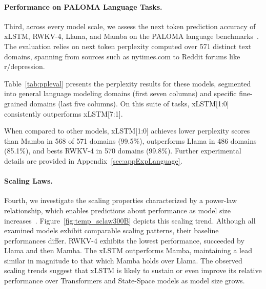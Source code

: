 \paragraph{Performance on PALOMA Language Tasks.} Third, across every model scale, we assess the next token prediction accuracy of xLSTM, RWKV-4, Llama, and Mamba on the PALOMA language benchmarks~\citep{Magnusson:23arxivshort}. The evaluation relies on next token perplexity computed over 571 distinct text domains, spanning from sources such as nytimes.com to Reddit forums like r/depression.

Table~\ref{tab:ppleval} presents the perplexity results for these models, segmented into general language modeling domains (first seven columns) and specific fine-grained domains (last five columns). On this suite of tasks, xLSTM[1:0] consistently outperforms xLSTM[7:1].

When compared to other models, xLSTM[1:0] achieves lower perplexity scores than Mamba in 568 of 571 domains (99.5\%), outperforms Llama in 486 domains (85.1\%), and bests RWKV-4 in 570 domains (99.8\%). Further experimental details are provided in Appendix~\ref{sec:appExpLanguage}.

\paragraph{Scaling Laws.} Fourth, we investigate the scaling properties characterized by a power-law relationship, which enables predictions about performance as model size increases~\citep{Kaplan:20,Brown:20short}. Figure~\ref{fig:temp_sclaw300B} depicts this scaling trend. Although all examined models exhibit comparable scaling patterns, their baseline performances differ. RWKV-4 exhibits the lowest performance, succeeded by Llama and then Mamba. The xLSTM outperforms Mamba, maintaining a lead similar in magnitude to that which Mamba holds over Llama. The observed scaling trends suggest that xLSTM is likely to sustain or even improve its relative performance over Transformers and State-Space models as model size grows.

